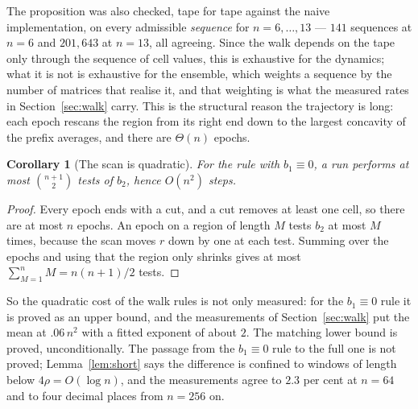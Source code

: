 \documentclass[11pt]{article}
\newtheorem{corollary}{Corollary}
\begin{document}
The proposition was also checked, tape for tape against the naive implementation, on every admissible \emph{sequence} for
$n=6,\dots,13$ --- $141$ sequences at $n=6$ and $201{,}643$ at $n=13$, all agreeing. Since the walk
depends on the tape only through the sequence of cell values, this is exhaustive for the dynamics;
what it is not is exhaustive for the ensemble, which weights a sequence by the number of matrices
that realise it, and that weighting is what the measured rates in Section~\ref{sec:walk} carry. This is the structural reason the
trajectory is long: each epoch rescans the region from its right end down to the largest concavity of
the prefix averages, and there are $\Theta(n)$ epochs.

\begin{corollary}[The scan is quadratic]
For the rule with $b_1\equiv0$, a run performs at most $\binom{n+1}{2}$ tests of $b_2$, hence $O(n^2)$
steps.
\end{corollary}

\begin{proof}
Every epoch ends with a cut, and a cut removes at least one cell, so there are at most $n$ epochs. An
epoch on a region of length $M$ tests $b_2$ at most $M$ times, because the scan moves $r$ down by one
at each test. Summing over the epochs and using that the region only shrinks gives at most
$\sum_{M=1}^{n}M=n(n+1)/2$ tests.
\end{proof}

So the quadratic cost of the walk rules is not only measured: for the $b_1\equiv0$ rule it is proved as
an upper bound, and the measurements of Section~\ref{sec:walk} put the mean at $.06\,n^2$ with a fitted
exponent of about $2$. The matching lower bound is proved, unconditionally.
The passage from the $b_1\equiv0$ rule to the full one is not proved; Lemma~\ref{lem:short} says the difference is confined to windows of
length below $4\rho=O(\log n)$, and the measurements agree to $2.3$ per cent at $n=64$ and to
four decimal places from $n=256$ on.
\end{document}
